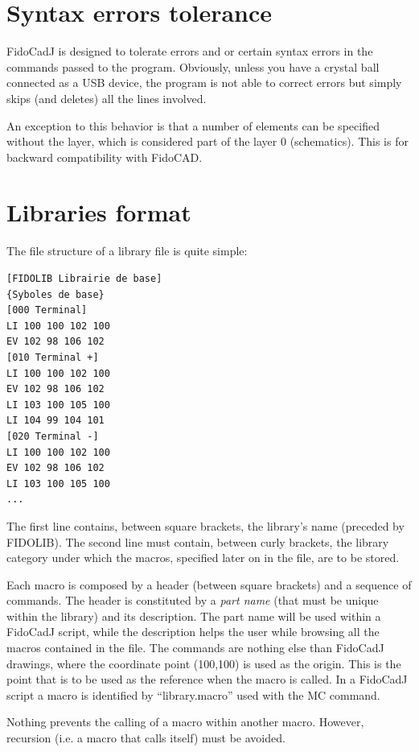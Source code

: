 \documentclass[10pt,a4paper,twoside]{scrreprt}
\begin{document}
\section{Syntax errors tolerance}

FidoCadJ is designed to tolerate errors and 
or certain syntax errors in the commands passed to the program. Obviously,
unless you have a crystal ball connected as a USB device,
the program is not able to correct errors but simply
skips (and deletes) all the lines involved.

An exception to this behavior is that a number of elements can
be specified without the layer, which is considered part of the
layer 0 (schematics). This is for backward compatibility
with FidoCAD.


\section{Libraries format}

The file structure of a library file is quite simple:

\begin{lstlisting}
[FIDOLIB Librairie de base]
{Syboles de base}
[000 Terminal]
LI 100 100 102 100
EV 102 98 106 102
[010 Terminal +]
LI 100 100 102 100
EV 102 98 106 102
LI 103 100 105 100
LI 104 99 104 101
[020 Terminal -]
LI 100 100 102 100
EV 102 98 106 102
LI 103 100 105 100
...
\end{lstlisting}
The first
line contains, between square brackets, the
library's name (preceded by FIDOLIB). The second line
must contain, between curly brackets, the library category under which
the macros, specified later on in the file, are to be stored.

Each macro is composed by a header (between square
brackets) and a sequence of commands. The header is constituted by
a \emph{part name} (that must be unique within the library) and its
description. The part name will be used within a FidoCadJ script, while
the description helps the user while browsing all the macros
contained in the file. The commands are nothing else than FidoCadJ
drawings, where the coordinate point (100,100) is used as the origin.
This is the point that is to be used as the reference when the macro
is called. In a FidoCadJ script a macro is identified by ``library.macro''
used with the MC command.

Nothing prevents the calling of a macro within another macro. However,
recursion (i.e. a macro that calls itself) must
be avoided.
\end{document}
